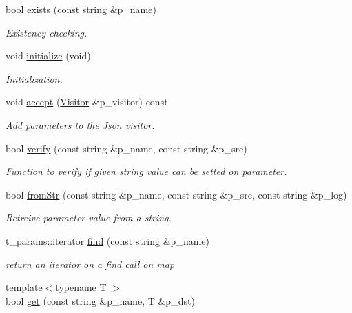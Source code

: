 \begin{DoxyCompactItemize}
bool \hyperlink{classxtd_1_1servers_1_1param_1_1Handler_a0fcbef276a961d96584354588fc3bfcf}{exists} (const string \&p\-\_\-name)
\begin{DoxyCompactList}\small\item\em Existency checking. \end{DoxyCompactList}\item 
void \hyperlink{classxtd_1_1servers_1_1param_1_1Handler_a9533d788448e6bfdaf1c0f439a9f7b05}{initialize} (void)
\begin{DoxyCompactList}\small\item\em Initialization. \end{DoxyCompactList}\item 
void \hyperlink{classxtd_1_1servers_1_1param_1_1Handler_aba6e8d983f28617b3168b60cf6464926}{accept} (\hyperlink{classxtd_1_1servers_1_1param_1_1Visitor}{Visitor} \&p\-\_\-visitor) const 
\begin{DoxyCompactList}\small\item\em Add parameters to the Json visitor. \end{DoxyCompactList}\item 
bool \hyperlink{classxtd_1_1servers_1_1param_1_1Handler_aa2b60f898a67bd55c4289686591a2f3b}{verify} (const string \&p\-\_\-name, const string \&p\-\_\-src)
\begin{DoxyCompactList}\small\item\em Function to verify if given string value can be setted on parameter. \end{DoxyCompactList}\item 
bool \hyperlink{classxtd_1_1servers_1_1param_1_1Handler_ab3a53b8db70cf25c3e1de6425d876c37}{from\-Str} (const string \&p\-\_\-name, const string \&p\-\_\-src, const string \&p\-\_\-log)
\begin{DoxyCompactList}\small\item\em Retreive parameter value from a string. \end{DoxyCompactList}\item 
t\-\_\-params\-::iterator \hyperlink{classxtd_1_1servers_1_1param_1_1Handler_a66465c7a1ee0978f7558d55bfd8bd583}{find} (const string \&p\-\_\-name)
\begin{DoxyCompactList}\small\item\em return an iterator on a find call on map \end{DoxyCompactList}\item 
{\footnotesize template$<$typename T $>$ }\\bool \hyperlink{classxtd_1_1servers_1_1param_1_1Handler_a0f767078fd33fec21e1677d0a0195d8e}{get} (const string \&p\-\_\-name, T \&p\-\_\-dst)

\end{DoxyCompactItemize}
